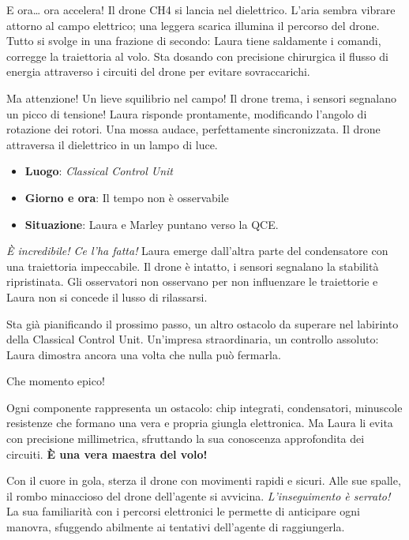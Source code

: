E ora… ora accelera! Il drone CH4 si lancia nel dielettrico. L’aria sembra vibrare attorno al campo elettrico; una leggera scarica illumina il percorso del drone. Tutto si svolge in una frazione di secondo: Laura tiene saldamente i comandi, corregge la traiettoria al volo. Sta dosando con precisione chirurgica il flusso di energia attraverso i circuiti del drone per evitare sovraccarichi.

Ma attenzione! Un lieve squilibrio nel campo! Il drone trema, i sensori segnalano un picco di tensione! Laura risponde prontamente, modificando l’angolo di rotazione dei rotori. Una mossa audace, perfettamente sincronizzata. Il drone attraversa il dielettrico in un lampo di luce.


\begin{tcolorbox}[colback=gray!5,colframe=gray!80,title=\textbf{Scheda Informativa}]
\begin{itemize}
    \item \textbf{Luogo}: \emph{Classical Control Unit}
    \item \textbf{Giorno e ora}: Il tempo non è osservabile
    \item \textbf{Situazione}: Laura e Marley puntano verso la QCE.
\end{itemize}
\end{tcolorbox}


\textit{È incredibile! Ce l'ha fatta!} Laura emerge dall’altra parte del condensatore con una traiettoria impeccabile. Il drone è intatto, i sensori segnalano la stabilità ripristinata. Gli osservatori non osservano per non influenzare le traiettorie e Laura non si concede il lusso di rilassarsi.

Sta già pianificando il prossimo passo, un altro ostacolo da superare nel labirinto della Classical Control Unit. Un’impresa straordinaria, un controllo assoluto: Laura dimostra ancora una volta che nulla può fermarla.

Che momento epico!


Ogni componente rappresenta un ostacolo: chip integrati, condensatori, minuscole resistenze che formano una vera e propria giungla elettronica. Ma Laura li evita con precisione millimetrica, sfruttando la sua conoscenza approfondita dei circuiti. \textbf{È una vera maestra del volo!}

Con il cuore in gola, sterza il drone con movimenti rapidi e sicuri. Alle sue spalle, il rombo minaccioso del drone dell'agente si avvicina. \emph{L'inseguimento è serrato!} La sua familiarità con i percorsi elettronici le permette di anticipare ogni manovra, sfuggendo abilmente ai tentativi dell'agente di raggiungerla.

